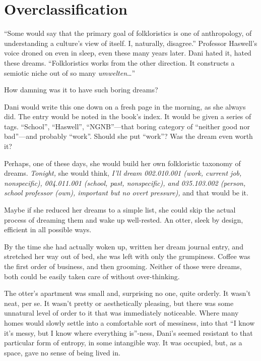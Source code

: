 \hypertarget{overclassification}{%
\chapter{Overclassification}\label{overclassification}}

``Some would say that the primary goal of folkloristics is one of anthropology, of understanding a culture's view of itself. I, naturally, disagree.'' Professor Haswell's voice droned on even in sleep, even these many years later. Dani hated it, hated these dreams. ``Folkloristics works from the other direction. It constructs a semiotic niche out of so many \emph{umwelten}\ldots{}''

How damning was it to have such boring dreams?

Dani would write this one down on a fresh page in the morning, as she always did. The entry would be noted in the book's index. It would be given a series of tags. ``School'', ``Haswell'', ``NGNB''---that boring category of ``neither good nor bad''---and probably ``work''. Should she put ``work''? Was the dream even worth it?

Perhaps, one of these days, she would build her own folkloristic taxonomy of dreams. \emph{Tonight,} she would think, \emph{I'll dream 002.010.001 (work, current job, nonspecific), 004.011.001 (school, past, nonspecific), and 035.103.002 (person, school professor (own), important but no overt pressure),} and that would be it.

Maybe if she reduced her dreams to a simple list, she could skip the actual process of dreaming them and wake up well-rested. An otter, sleek by design, efficient in all possible ways.

By the time she had actually woken up, written her dream journal entry, and stretched her way out of bed, she was left with only the grumpiness. Coffee was the first order of business, and then grooming. Neither of those were dreams, both could be easily taken care of without over-thinking.

The otter's apartment was small and, surprising no one, quite orderly. It wasn't neat, per se. It wasn't pretty or aesthetically pleasing, but there was some unnatural level of order to it that was immediately noticeable. Where many homes would slowly settle into a comfortable sort of messiness, into that ``I know it's messy, but I know where everything is''-ness, Dani's seemed resistant to that particular form of entropy, in some intangible way. It was occupied, but, as a space, gave no sense of being lived in.

